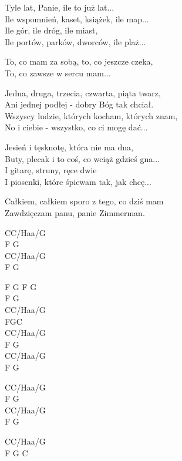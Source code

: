 \begin{text}
    Tyle lat, Panie, ile to już lat...\\
    Ile wspomnień, kaset, książek, ile map...\\
    Ile gór, ile dróg, ile miast,\\
    Ile portów, parków, dworców, ile plaż...

    To, co mam za sobą, to, co jeszcze czeka,\\
    To, co zawsze w sercu mam...

    \hfill\break
    Jedna, druga, trzecia, czwarta, piąta twarz,\\
    Ani jednej podłej - dobry Bóg tak chciał.\\
    Wszyscy ludzie, których kocham, których znam,\\
    No i ciebie - wszystko, co ci mogę dać...

    Jesień i tęsknotę, która nie ma dna,\\
    Buty, plecak i to coś, co wciąż gdzieś gna...\\
    I gitarę, struny, ręce dwie\\
    I piosenki, które śpiewam tak, jak chcę...

    Całkiem, całkiem sporo z tego, co dziś mam\\
    Zawdzięczam panu, panie Zimmerman.
\end{text}
\begin{chord}
    CC/Haa/G\\
    F G\\
    CC/Haa/G\\
    F G

    F G F G\\
    F G\\
    CC/Haa/G\\
    FGC\\
    CC/Haa/G\\
    F G\\
    CC/Haa/G\\
    F G

    CC/Haa/G\\
    F G\\
    CC/Haa/G\\
    F G

    CC/Haa/G\\
    F G C
\end{chord}